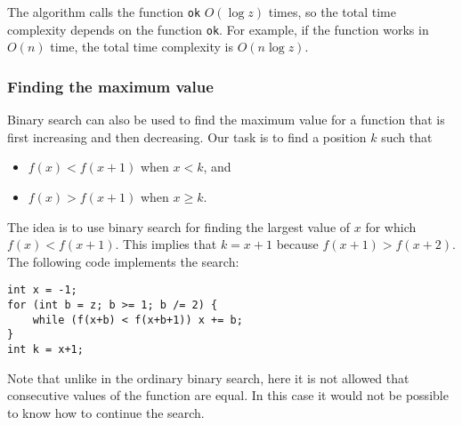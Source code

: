 The algorithm calls the function \texttt{ok}
$O(\log z)$ times, so the total time complexity
depends on the function \texttt{ok}.
For example, if the function works in $O(n)$ time,
the total time complexity is $O(n \log z)$.

\subsubsection{Finding the maximum value}

Binary search can also be used to find
the maximum value for a function that is
first increasing and then decreasing.
Our task is to find a position $k$ such that

\begin{itemize}
\item
$f(x)<f(x+1)$ when $x<k$, and
\item
$f(x)>f(x+1)$ when $x \ge k$.
\end{itemize}

The idea is to use binary search
for finding the largest value of $x$
for which $f(x)<f(x+1)$.
This implies that $k=x+1$
because $f(x+1)>f(x+2)$.
The following code implements the search: 

\begin{lstlisting}
int x = -1;
for (int b = z; b >= 1; b /= 2) {
    while (f(x+b) < f(x+b+1)) x += b;
}
int k = x+1;
\end{lstlisting}

Note that unlike in the ordinary binary search,
here it is not allowed that consecutive values
of the function are equal.
In this case it would not be possible to know
how to continue the search.
